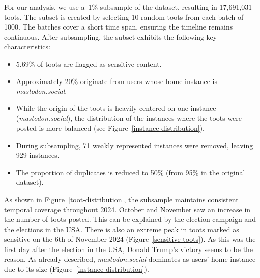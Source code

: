For our analysis, we use a~1\% subsample of the dataset, resulting in 17,691,031 toots. The subset is created by selecting 10 random toots from each batch of 1000. The batches cover a short time span, ensuring the timeline remains continuous. After subsampling, the subset exhibits the following key characteristics:

\begin{itemize}
\item 5.69\% of toots are flagged as sensitive content.
\item Approximately 20\% originate from users whose home instance is \textit{mastodon.social}.
\item While the origin of the toots is heavily centered on one instance (\textit{mastodon.social}), the distribution of the instances where the toots were posted is more balanced (see Figure~\ref{instance-distribution}).
\item During subsampling, 71 weakly represented instances were removed, leaving 929 instances.
\item The proportion of duplicates is reduced to 50\% (from 95\% in the original dataset).
\end{itemize}

As shown in Figure~\ref{toot-distribution}, the subsample maintains consistent temporal coverage throughout 2024. October and November saw an increase in the number of toots posted. This can be explained by the election campaign and the elections in the USA. There is also an extreme peak in toots marked as sensitive on the 6th of November 2024 (Figure~\ref{sensitive-toots}). As this was the first day after the election in the USA, Donald Trump's victory seems to be the reason. As \citet{zia:2023} already described, \textit{mastodon.social} dominates as users' home instance due to its size (Figure~\ref{instance-distribution}).